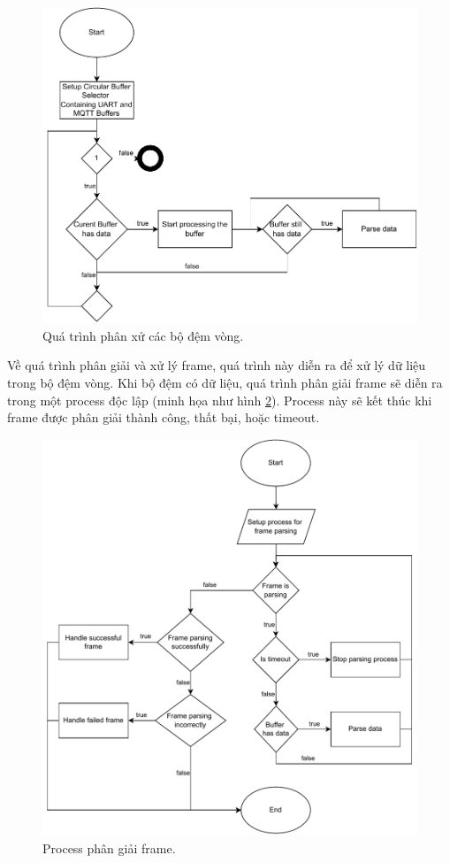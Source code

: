 \begin{figure}[htp]
\centering
\includegraphics[width=1.0\linewidth]{images/Thesis-Page-9-CBuf-Abritrating.pdf}
\caption{Quá trình phân xử các bộ đệm vòng.}
\label{fig:CBuf-Abritrating}
\end{figure}

Về quá trình phân giải và xử lý frame, quá trình này diễn ra để xử lý dữ liệu trong bộ đệm vòng. Khi bộ đệm có dữ liệu, quá trình phân giải frame sẽ diễn ra trong một process độc lập (minh họa như hình \ref{fig:Frame-Parsing-Process}). Process này sẽ kết thúc khi frame được phân giải thành công, thất bại, hoặc timeout.

\begin{figure}[htp]
\centering
\includegraphics[width=1.0\linewidth]{images/Thesis-Page-10-Frame-Parsing-Process.pdf}
\caption{Process phân giải frame.}
\label{fig:Frame-Parsing-Process}
\end{figure}


